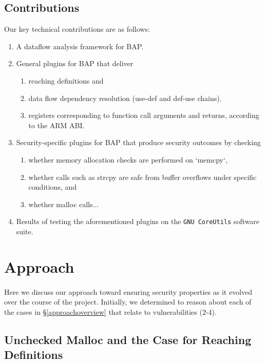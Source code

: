 \documentclass[letterpaper,11pt]{article}
\begin{document}

\subsection{Contributions}

Our key technical contributions are as follows:

\begin{enumerate}
  \item A dataflow analysis framework for BAP.
  \item General plugins for BAP that deliver
    \begin{enumerate}
      \item reaching definitions and
      \item data flow dependency resolution (use-def and def-use chains).
      \item registers corresponding to function call arguments and returns,
            according to the ARM ABI.
    \end{enumerate}
  \item Security-specific plugins for BAP that produce security outcomes by checking
    \begin{enumerate}
      \item whether memory allocation checks are performed on `memcpy`,
      \item whether calls such as strcpy are safe from buffer overflows under
        specific conditions, and
      \item whether malloc calls... %
    \end{enumerate}
  \item Results of testing the aforementioned plugins on the \texttt{GNU CoreUtils}
    software suite.
\end{enumerate}

\section{Approach}

\paragraph{}
Here we discuss our approach toward ensuring security properties as it evolved
over the course of the project. Initially, we determined to reason about each
of the cases in \S\ref{approachoverview} that relate to vulnerabilities
(2-4). 

\subsection{Unchecked Malloc and the Case for Reaching Definitions}
\end{document}

